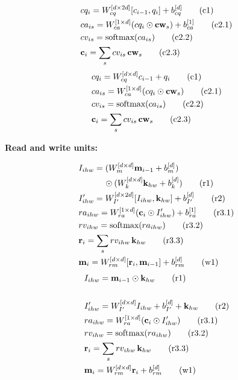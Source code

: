 \begin{multicols}{2}
	\noindent
	\begin{align*}
	&cq_i = W_{cq}^{[d \times 2d]} [c_{i-1}, q_i] + b_{cq}^{[d]}  \tag{c1} \\
	&ca_{is} = W_{ca}^{[1 \times d]} (cq_i \odot \mathbf{cw}_s) + b_{ca}^{[1]}
	\tag{c2.1}\\
	&cv_{is} = \textrm{softmax}(ca_{is}) \tag{c2.2}\\
	&\mathbf{c}_i = \sum_s cv_{is} \, \mathbf{cw}_s  \tag{c2.3}
	\end{align*}
	\columnbreak
	{\color{Plum}
	\begin{align*}
	&cq_i = W_{cq}^{[d \times d]} c_{i-1} + q_i  \tag{c1} \\
	&ca_{is} = W_{ca}^{[1 \times d]} (cq_i \odot \mathbf{cw}_s)  \tag{c2.1}\\
	&cv_{is} = \textrm{softmax}(ca_{is}) \tag{c2.2}\\
	&\mathbf{c}_i = \sum_s cv_{is} \, \mathbf{cw}_s  \tag{c2.3}
    \end{align*}}
\end{multicols}

\vskip -1.0cm
\noindent\textbf{Read and write units:}
\begin{multicols}{2}
	\noindent
	\begin{align*}
	&I_{ihw} = (W_{m}^{[d \times d]} \mathbf{m}_{i-1} + b_{m}^{[d]}) \\
	           & \qquad \quad \odot (W_{k}^{[d \times d]} \mathbf{k}_{hw} + b_{k}^{[d]}) \tag{r1} \\
	&I'_{ihw} =  W_{I'}^{[d \times 2d]} [I_{ihw},\mathbf{k}_{hw}]  + b_{I'}^{[d]}  \tag{r2} \\
	&ra_{ihw} = W_{ra}^{[1 \times d]} (\mathbf{c}_i \odot I'_{ihw}) + b_{ra}^{[1]} \tag{r3.1}\\
	&rv_{ihw} = \textrm{softmax}(ra_{ihw}) \tag{r3.2}\\
	&\mathbf{r}_i = \sum_s rv_{ihw} \, \mathbf{k}_{hw}  \tag{r3.3}\\
	&\mathbf{m}_i = W_{rm}^{[d \times d]} [\mathbf{r}_i, \mathbf{m}_{i-1}]  + b_{rm}^{[d]} \tag{w1}	
	\end{align*}
	\columnbreak
	{\color{Plum}
	\begin{align*}
	&I_{ihw} = \mathbf{m}_{i-1} \odot \mathbf{k}_{hw} \tag{r1} \\ \\
	&I'_{ihw} = W_{I'}^{[d \times d]} I_{ihw} + b_{I'}^{[d]} + \mathbf{k}_{hw} \tag{r2} \\
	&ra_{ihw} = W_{ra}^{[1 \times d]} (\mathbf{c}_i \odot I'_{ihw})  \tag{r3.1}\\
	&rv_{ihw} = \textrm{softmax}(ra_{ihw}) \tag{r3.2}\\
	&\mathbf{r}_i = \sum_s rv_{ihw} \, \mathbf{k}_{hw}  \tag{r3.3}\\
	&\mathbf{m}_i = W_{rm}^{[d \times d]} \mathbf{r}_i + b_{rm}^{[d]} \tag{w1}
	\end{align*}}
\end{multicols}


